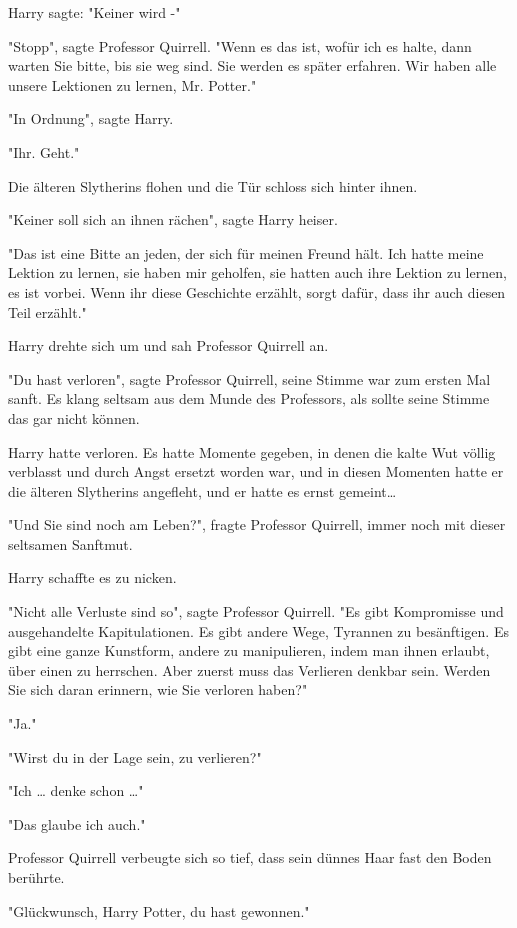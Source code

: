 {Harry sagte: "Keiner wird -"

"Stopp", sagte Professor Quirrell. "Wenn es das ist, wofür ich es halte, dann warten Sie bitte, bis sie weg sind. Sie werden es später erfahren. Wir haben alle unsere Lektionen zu lernen, Mr. Potter."

"In Ordnung", sagte Harry.

"Ihr. Geht."

Die älteren Slytherins flohen und die Tür schloss sich hinter ihnen.

"Keiner soll sich an ihnen rächen", sagte Harry heiser.

"Das ist eine Bitte an jeden, der sich für meinen Freund hält. Ich hatte meine Lektion zu lernen, sie haben mir geholfen, sie hatten auch ihre Lektion zu lernen, es ist vorbei. Wenn ihr diese Geschichte erzählt, sorgt dafür, dass ihr auch diesen Teil erzählt."

Harry drehte sich um und sah Professor Quirrell an.

"Du hast verloren", sagte Professor Quirrell, seine Stimme war zum ersten Mal sanft. Es klang seltsam aus dem Munde des Professors, als sollte seine Stimme das gar nicht können.

Harry hatte verloren. Es hatte Momente gegeben, in denen die kalte Wut völlig verblasst und durch Angst ersetzt worden war, und in diesen Momenten hatte er die älteren Slytherins angefleht, und er hatte es ernst gemeint…

"Und Sie sind noch am Leben?", fragte Professor Quirrell, immer noch mit dieser seltsamen Sanftmut.

Harry schaffte es zu nicken.

"Nicht alle Verluste sind so", sagte Professor Quirrell. "Es gibt Kompromisse und ausgehandelte Kapitulationen. Es gibt andere Wege, Tyrannen zu besänftigen. Es gibt eine ganze Kunstform, andere zu manipulieren, indem man ihnen erlaubt, über einen zu herrschen. Aber zuerst muss das Verlieren denkbar sein. Werden Sie sich daran erinnern, wie Sie verloren haben?"

"Ja."

"Wirst du in der Lage sein, zu verlieren?"

"Ich … denke schon …"

"Das glaube ich auch."

Professor Quirrell verbeugte sich so tief, dass sein dünnes Haar fast den Boden berührte.

"Glückwunsch, Harry Potter, du hast gewonnen."

}
